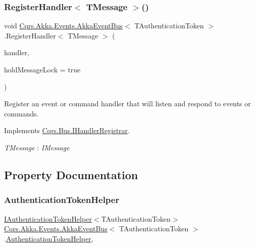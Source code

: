 \subsubsection{\texorpdfstring{Register\+Handler$<$ T\+Message $>$()}{RegisterHandler< TMessage >()}\hspace{0.1cm}{\footnotesize\ttfamily [2/2]}}
{\footnotesize\ttfamily void \hyperlink{classCqrs_1_1Akka_1_1Events_1_1AkkaEventBus}{Cqrs.\+Akka.\+Events.\+Akka\+Event\+Bus}$<$ T\+Authentication\+Token $>$.Register\+Handler$<$ T\+Message $>$ (\begin{DoxyParamCaption}\item[{Action$<$ T\+Message $>$}]{handler,  }\item[{bool}]{hold\+Message\+Lock = {\ttfamily true} }\end{DoxyParamCaption})}



Register an event or command handler that will listen and respond to events or commands. 



Implements \hyperlink{interfaceCqrs_1_1Bus_1_1IHandlerRegistrar_a07792dcc9a8b272709ff2e2dd336a642_a07792dcc9a8b272709ff2e2dd336a642}{Cqrs.\+Bus.\+I\+Handler\+Registrar}.

\begin{Desc}
\item[Type Constraints]\begin{description}
\item[{\em T\+Message} : {\em I\+Message}]\end{description}
\end{Desc}


\subsection{Property Documentation}
\mbox{\label{classCqrs_1_1Akka_1_1Events_1_1AkkaEventBus_a03166dfca723430ae548e833a2262632_a03166dfca723430ae548e833a2262632}} 
\subsubsection{\texorpdfstring{Authentication\+Token\+Helper}{AuthenticationTokenHelper}}
{\footnotesize\ttfamily \hyperlink{interfaceCqrs_1_1Authentication_1_1IAuthenticationTokenHelper}{I\+Authentication\+Token\+Helper}$<$T\+Authentication\+Token$>$ \hyperlink{classCqrs_1_1Akka_1_1Events_1_1AkkaEventBus}{Cqrs.\+Akka.\+Events.\+Akka\+Event\+Bus}$<$ T\+Authentication\+Token $>$.\hyperlink{classCqrs_1_1Authentication_1_1AuthenticationTokenHelper}{Authentication\+Token\+Helper}\hspace{0.3cm}{\ttfamily [get]}, {\ttfamily [protected]}}

